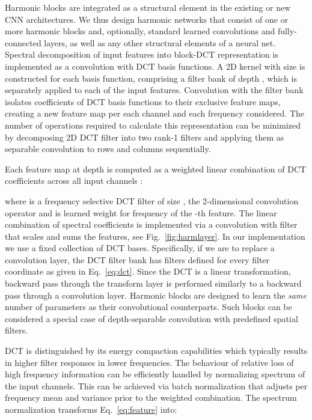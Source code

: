 \documentclass[12pt,a4paper]{article}
\begin{document}
Harmonic blocks are integrated as a structural element in the existing or new CNN architectures. We thus design harmonic networks that consist of one or more harmonic blocks and, optionally, standard learned convolutions and fully-connected layers, as well as any other structural elements of a neural net.
Spectral decomposition of input features into block-DCT representation is implemented as a convolution with DCT basis functions. A 2D kernel with size  is constructed for each basis function, comprising a filter bank of depth , which is separately applied to each of the input features. Convolution with the filter bank isolates coefficients of DCT basis functions to their exclusive feature maps, creating a new feature map per each channel and each frequency considered. The number of operations required to calculate this representation can be minimized by decomposing 2D DCT filter into two rank-1 filters and applying them as separable convolution to rows and columns sequentially. 

Each feature map  at depth  is computed as a weighted linear combination of DCT coefficients across all input channels :

where  is a  frequency selective DCT filter of size ,  the 2-dimensional convolution operator and  is learned weight for  frequency of the -th feature. The linear combination of spectral coefficients is implemented via a convolution with  filter that scales and sums the features, see Fig.~\ref{fig:harmlayer}.
In our implementation we use a fixed collection of DCT bases. Specifically, if we are to replace a  convolution layer, the DCT filter bank  has filters defined for every filter coordinate  as given in Eq.~\ref{eq:dct}.
Since the DCT is a linear transformation, backward pass through the transform layer is performed similarly to a backward pass through a convolution layer. Harmonic blocks are designed to learn the {\it same} number of parameters as their convolutional counterparts. Such blocks can be considered a special case of depth-separable convolution with predefined spatial filters. 

DCT is distinguished by its energy compaction capabilities which typically results in higher filter responses in lower frequencies. The behaviour of relative loss of high frequency information can be efficiently handled by normalizing spectrum of the input channels. This can be achieved via batch normalization that adjusts per frequency mean and variance prior to the weighted combination. The spectrum normalization transforms Eq.~\eqref{eq:feature} into: 
\end{document}
